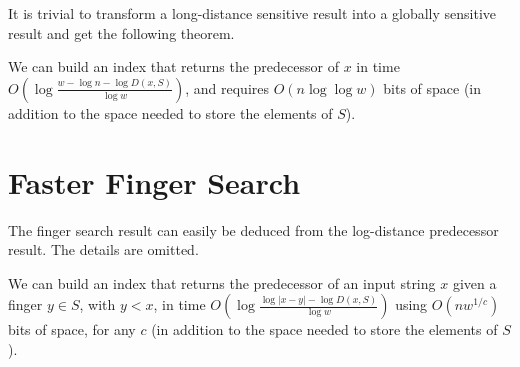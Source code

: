 \documentclass[11pt]{llncs}
\begin{document}
It is trivial to transform a long-distance sensitive result into a globally sensitive result and get the following theorem. 
\begin{theorem}
\label{thm:pred-long2}
We can build an index that returns the predecessor of $x$
in time $O(\log\frac{w-\log n-\log D(x,S)}{\log w})$, and requires $O(n \log\log w )$
bits of space (in addition to the space needed to store the elements of $S$).
\end{theorem}

\section{Faster Finger Search}
The finger search result can easily be deduced from the log-distance predecessor result. The details are omitted. 
\begin{theorem}
\label{th:finger}
We can build an index that returns the predecessor of an input string $x$ given
a finger $y\in S$, with $y<x$, in time $O(\log\frac{\log|x-y|-\log D(x,S)}{\log w})$ using  
$O(n w^{1/c})$ bits 
of space, for any $c$ (in addition to the space needed to store the elements of $S$).
\end{theorem}




\end{document}
